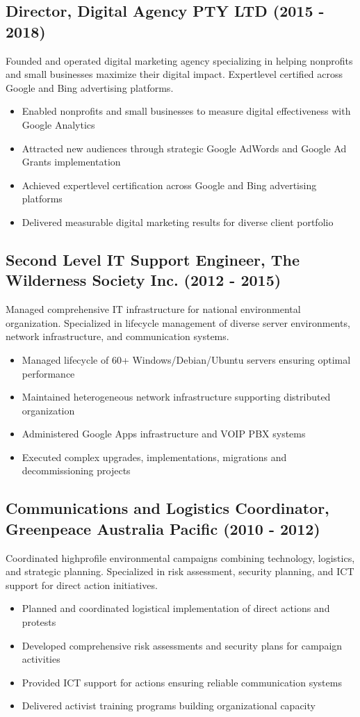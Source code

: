 \documentclass{article}
\begin{document}
\subsection*{Director, Digital Agency PTY LTD (2015 - 2018)}
Founded and operated digital marketing agency specializing in helping nonprofits and small businesses maximize their digital impact. Expertlevel certified across Google and Bing advertising platforms.
\begin{itemize}
    \item Enabled nonprofits and small businesses to measure digital effectiveness with Google Analytics
    \item Attracted new audiences through strategic Google AdWords and Google Ad Grants implementation
    \item Achieved expertlevel certification across Google and Bing advertising platforms
    \item Delivered measurable digital marketing results for diverse client portfolio
\end{itemize}

\subsection*{Second Level IT Support Engineer, The Wilderness Society Inc. (2012 - 2015)}
Managed comprehensive IT infrastructure for national environmental organization. Specialized in lifecycle management of diverse server environments, network infrastructure, and communication systems.
\begin{itemize}
    \item Managed lifecycle of 60+ Windows/Debian/Ubuntu servers ensuring optimal performance
    \item Maintained heterogeneous network infrastructure supporting distributed organization
    \item Administered Google Apps infrastructure and VOIP PBX systems
    \item Executed complex upgrades, implementations, migrations and decommissioning projects
\end{itemize}

\subsection*{Communications and Logistics Coordinator, Greenpeace Australia Pacific (2010 - 2012)}
Coordinated highprofile environmental campaigns combining technology, logistics, and strategic planning. Specialized in risk assessment, security planning, and ICT support for direct action initiatives.
\begin{itemize}
    \item Planned and coordinated logistical implementation of direct actions and protests
    \item Developed comprehensive risk assessments and security plans for campaign activities
    \item Provided ICT support for actions ensuring reliable communication systems
    \item Delivered activist training programs building organizational capacity
\end{itemize}
\end{document}
